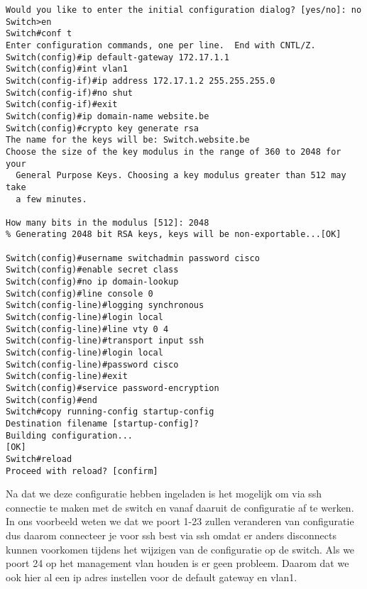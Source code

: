 \begin{center}
\begin{verbatim}
Would you like to enter the initial configuration dialog? [yes/no]: no
Switch>en
Switch#conf t
Enter configuration commands, one per line.  End with CNTL/Z.
Switch(config)#ip default-gateway 172.17.1.1
Switch(config)#int vlan1
Switch(config-if)#ip address 172.17.1.2 255.255.255.0
Switch(config-if)#no shut
Switch(config-if)#exit
Switch(config)#ip domain-name website.be
Switch(config)#crypto key generate rsa
The name for the keys will be: Switch.website.be
Choose the size of the key modulus in the range of 360 to 2048 for your
  General Purpose Keys. Choosing a key modulus greater than 512 may take
  a few minutes.

How many bits in the modulus [512]: 2048
% Generating 2048 bit RSA keys, keys will be non-exportable...[OK]

Switch(config)#username switchadmin password cisco
Switch(config)#enable secret class
Switch(config)#no ip domain-lookup
Switch(config)#line console 0
Switch(config-line)#logging synchronous
Switch(config-line)#login local
Switch(config-line)#line vty 0 4
Switch(config-line)#transport input ssh
Switch(config-line)#login local
Switch(config-line)#password cisco
Switch(config-line)#exit
Switch(config)#service password-encryption
Switch(config)#end
Switch#copy running-config startup-config
Destination filename [startup-config]? 
Building configuration...
[OK]
Switch#reload
Proceed with reload? [confirm]
\end{verbatim}
\end{center}

Na dat we deze configuratie hebben ingeladen is het mogelijk om via ssh connectie te maken met de switch en vanaf daaruit de configuratie af te werken. In ons voorbeeld weten we dat we poort 1-23 zullen veranderen van configuratie dus daarom connecteer je voor ssh best via ssh omdat er anders disconnects kunnen voorkomen tijdens het wijzigen van de configuratie op de switch. Als we poort 24 op het management vlan houden is er geen probleem. Daarom dat we ook hier al een ip adres instellen voor de default gateway en vlan1.

